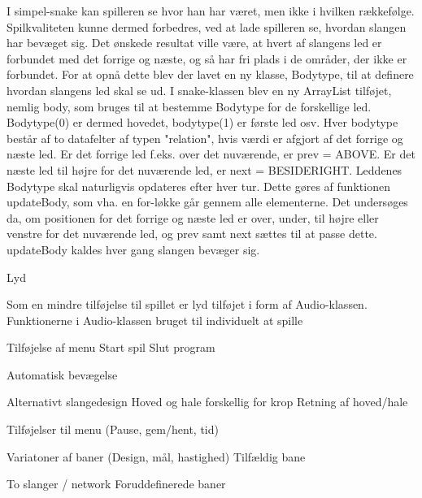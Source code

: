 I simpel-snake kan spilleren se hvor han har været, men ikke i hvilken rækkefølge. Spilkvaliteten kunne dermed forbedres, ved at lade spilleren se, hvordan slangen har bevæget sig. Det ønskede resultat ville være, at hvert af slangens led er forbundet med det forrige og næste, og så har fri plads i de områder, der ikke er forbundet.
For at opnå dette blev der lavet en ny klasse, Bodytype, til at definere hvordan slangens led skal se ud. I snake-klassen blev en ny ArrayList tilføjet, nemlig body, som bruges til at bestemme Bodytype for de forskellige led. Bodytype(0) er dermed hovedet, bodytype(1) er første led osv. Hver bodytype består af to datafelter af typen "relation", hvis værdi er afgjort af det forrige og næste led. Er det forrige led f.eks. over det nuværende, er prev = ABOVE. Er det næste led til højre for det nuværende led, er next = BESIDERIGHT.
Leddenes Bodytype skal naturligvis opdateres efter hver tur. Dette gøres af funktionen updateBody, som vha. en for-løkke går gennem alle elementerne. Det undersøges da, om positionen for det forrige og næste led er over, under, til højre eller venstre for det nuværende led, og prev samt next sættes til at passe dette. updateBody kaldes hver gang slangen bevæger sig.

Lyd

Som en mindre tilføjelse til spillet er lyd tilføjet i form af Audio-klassen. Funktionerne i Audio-klassen bruget til individuelt at spille 

Tilføjelse af menu
	Start spil
	Slut program

Automatisk bevægelse

Alternativt slangedesign
	Hoved og hale forskellig for krop
	Retning af hoved/hale

Tilføjelser til menu (Pause, gem/hent, tid)

Variatoner af baner (Design, mål, hastighed)
	Tilfældig bane

To slanger / network
	Foruddefinerede baner
	

